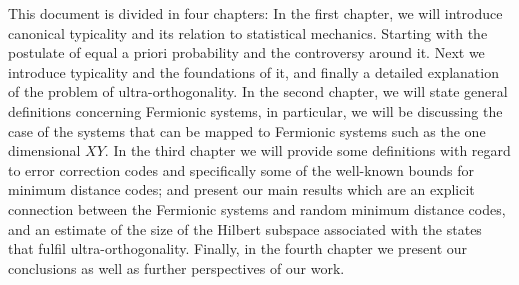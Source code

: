 





 


\indent This document is divided in four chapters: In the first chapter, we will introduce canonical typicality and its relation to statistical mechanics. Starting with the postulate of equal a priori probability and the controversy around it. Next we introduce typicality and the foundations of it, and finally a detailed explanation of the problem of ultra-orthogonality. In the second chapter, we will state general definitions concerning Fermionic systems, in particular, we will be discussing the case of the systems that can be mapped to Fermionic systems such as the one dimensional $XY$. In the third chapter we will provide some definitions with regard to error correction codes and specifically some of the well-known bounds for minimum distance codes; and present our main results which are an explicit connection between the Fermionic systems and random minimum distance codes, and an estimate of the size of the Hilbert subspace associated with the states that fulfil ultra-orthogonality. Finally, in the fourth chapter we present our conclusions as well as further perspectives of our work.

